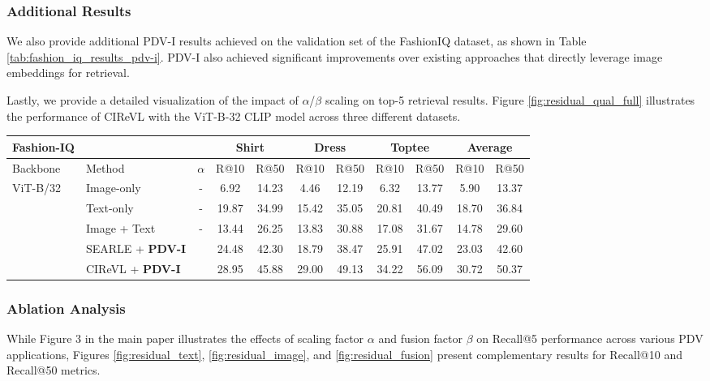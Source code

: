 \subsubsection{Additional Results}
We also provide additional PDV-I results achieved on the validation set of the FashionIQ dataset, as shown in Table \ref{tab:fashion_iq_results_pdv-i}. PDV-I also achieved significant improvements over existing approaches that directly leverage image embeddings for retrieval.

Lastly, we provide a detailed visualization of the impact of $\alpha$/$\beta$ scaling on top-5 retrieval results. Figure \ref{fig:residual_qual_full} illustrates the performance of CIReVL with the ViT-B-32 CLIP model across three different datasets.

\begin{table*}[!tb]
	\centering
	\small
	\begin{tabular}{l| l |c|cccccccc}
		\hline
		Fashion-IQ & & &\multicolumn{2}{c}{Shirt} & \multicolumn{2}{c}{Dress} & \multicolumn{2}{c}{Toptee} & \multicolumn{2}{c}{Average} \\ \hline
		Backbone & Method & $\alpha$ & R@10 & R@50 & R@10 & R@50 & R@10 & R@50 & R@10 & R@50 \\
		\hline
		\multirow{5}{*}{ViT-B/32} & Image-only \textdagger & -& 6.92 & 14.23 & 4.46 & 12.19 & 6.32 & 13.77 & 5.90 & 13.37 \\
		& Text-only \textdagger & - & 19.87 & 34.99 & 15.42 & 35.05 & 20.81 & 40.49 & 18.70 & 36.84 \\
		& Image + Text \textdagger & - & 13.44 & 26.25 & 13.83 & 30.88 & 17.08 & 31.67 & 14.78 & 29.60 \\
		& SEARLE + \textbf{PDV-I} & & 24.48 & 42.30 & 18.79 & 38.47 & 25.91 & 47.02 & 23.03 &  42.60\\
		& CIReVL + \textbf{PDV-I} & & 28.95 & 45.88 & 29.00 & 49.13 & 34.22 & 56.09 & 30.72 & 50.37 \\
		\hline
	\end{tabular}
	\caption{PDV-I performance on FashionIQ val datasets. \textdagger~denotes that numbers are taken from the original paper.}
	\label{tab:fashion_iq_results_pdv-i}
\end{table*}

\subsubsection{Ablation Analysis}
While Figure 3 in the main paper illustrates the effects of scaling factor $\alpha$ and fusion factor $\beta$ on Recall@5 performance across various PDV applications, Figures \ref{fig:residual_text}, \ref{fig:residual_image}, and \ref{fig:residual_fusion} present complementary results for Recall@10 and Recall@50 metrics.

